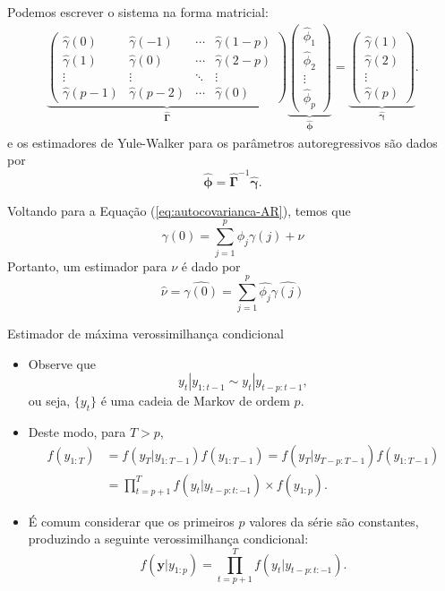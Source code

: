 \documentclass[
  letterpaper,
  DIV=11,
  numbers=noendperiod]{scrreprt}
\theoremstyle{definition}
\theoremstyle{plain}
\theoremstyle{definition}
\theoremstyle{plain}
\theoremstyle{remark}
\begin{document}
\begin{frame}
    Podemos escrever o sistema na forma matricial:
    \begin{align*}
    \underbrace{\left(
    \begin{array}{cccc}
\hat{\gamma}(0) & \hat{\gamma}(-1) & \cdots & \hat{\gamma}(1-p) \\ 
\hat{\gamma}(1) & \hat{\gamma}(0)  & \cdots & \hat{\gamma}(2-p) \\ 
         \vdots & \vdots               & \ddots                & \vdots\\
\hat{\gamma}(p-1) & \hat{\gamma}(p-2) &  \cdots & \hat{\gamma}(0)   
    \end{array}\right)}_{\hat{\bm{\Gamma}}}
    \underbrace{\left( \begin{array}{c} \hat{\phi}_1 \\ \hat{\phi}_2 \\ \vdots \\ \hat{\phi}_p   \end{array}\right)}_{\hat{\bm{\phi}}}=
    \underbrace{\left( \begin{array}{c} \hat{\gamma}(1) \\ \hat{\gamma}(2) \\ \vdots \\ \hat{\gamma}(p)   \end{array}\right)}_{\hat{\bm{\gamma}}}.
    \end{align*}
    e os estimadores de Yule-Walker para os parâmetros autoregressivos são dados por
    $$\hat{\bm{\phi}}=\hat{\bm{\Gamma}}^{-1}\hat{\bm{\gamma}}.$$ 
\end{frame}

\begin{frame}
    Voltando para a Equação (\ref{eq:autocovarianca-AR}), temos que
    $$\gamma(0)=\sum_{j=1}^{p}\phi_j \gamma(j)+\nu$$
    Portanto, um estimador para $\nu$ é dado por
    $$\hat{\nu}=  
  \hat{\gamma(0)}=\sum_{j=1}^{p}\hat{\phi_j}\hat{\gamma(j)}$$
\end{frame}

\begin{frame}{Estimador de máxima verossimilhança condicional}
    \begin{itemize}
        \item Observe que
        $$y_t|y_{1:t-1}\sim y_t|y_{t-p:t-1},$$
        ou seja, $\{y_t\}$ é uma cadeia de Markov de ordem $p$.
        \item Deste modo, para $T>p$,
        \begin{align*}
        f(y_{1:T})&=f\left(y_T|y_{1:T-1}\right)f\left(y_{1:T-1}\right)=f\left(y_T|y_{T-p:T-1}\right)f\left(y_{1:T-1}\right)\\
        &=\prod_{t=p+1}^{T}f\left(y_t|y_{t-p:t:-1}\right)\times f(y_{1:p}).
        \end{align*}
        \item É comum considerar que os primeiros $p$ valores da série são constantes, produzindo a seguinte verossimilhança condicional:
        $$f(\bm{y}|y_{1:p})=\prod_{t=p+1}^{T}f\left(y_t|y_{t-p:t:-1}\right).$$
    \end{itemize}
\end{frame}
\end{document}
